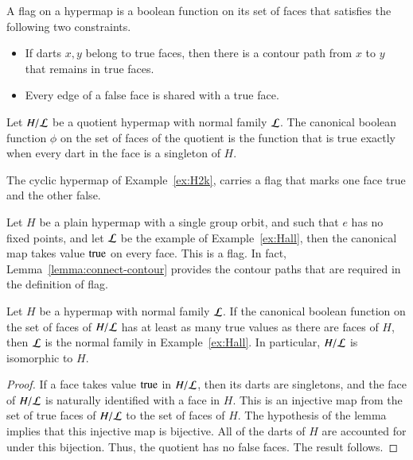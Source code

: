 \begin{definition}[flag]  A flag on a hypermap
is a boolean function on its set of faces 
that satisfies the following two
constraints.
\begin{itemize}
    \item If darts $x,y$ belong to true faces,
    then there is a contour path from $x$ to $y$ that remains
    in true faces.
    \item Every edge of a false face is shared with a true face.
    \end{itemize}
\end{definition}

\begin{example} Let $H/{\cal L}$ be a quotient hypermap with
normal family $\cal L$.  The canonical boolean function
$\phi$ on the set of faces of the quotient is the function that
is true exactly when every dart in
the face is a singleton of $H$.
\end{example}

\begin{example} The cyclic hypermap of Example~\ref{ex:H2k}, 
carries a flag
that marks one face true and the other false.
\end{example}

\begin{example} Let 
$H$ be a plain hypermap with a single group orbit, and 
such that $e$ has no fixed points,
and let $\cal L$ be the example of Example~\ref{ex:Hall}, 
then the canonical
map takes value ${\operatorname{true}}$ on every face.  This is a flag.
In fact,
Lemma~\ref{lemma:connect-contour} provides the contour paths 
that are required in the definition of flag.
\end{example}

\begin{lemma}  
Let $H$ be a hypermap with normal family ${\cal L}$.
If the canonical boolean function on the set of faces of
$H/{\cal L}$ has at least as many
true values as there are faces of $H$, then $\cal L$ is the normal family
in Example~\ref{ex:Hall}. In particular, $H/{\cal L}$ is isomorphic to $H$.
\end{lemma}

\begin{proof}  If a face takes value ${\operatorname{true}}$ 
in $H/{\cal L}$, then its darts are
singletons, and the face of $H/{\cal L}$ is naturally identified with
 a face in $H$.  This is an injective map from the 
set of true faces of $H/{\cal L}$ to
the set of faces of $H$.  The hypothesis of the lemma implies that this
injective map is bijective.
All of the darts of $H$ are accounted for under this bijection.
Thus, the quotient has no
false faces.  The result follows.
\end{proof}


